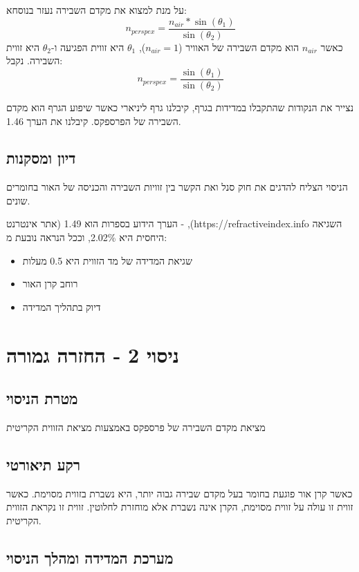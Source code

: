 \documentclass[14pt]{extarticle}
\begin{document}
על מנת למצוא את מקדם השבירה נעזר בנוסחא:
\begin{equation}
n_{perspex} = \frac{n_{air} * \sin(\theta_1)}{\sin(\theta_2)}
\end{equation}
כאשר $n_{air}$ הוא מקדם השבירה של האוויר ($n_{air}=1$), $\theta_1$ היא זווית הפגיעה ו-$\theta_2$ היא זווית השבירה. נקבל:
\begin{equation}
n_{perspex} = \frac{\sin(\theta_1)}{\sin(\theta_2)}
\end{equation}

נצייר את הנקודות שהתקבלו במדידות בגרף, קיבלנו גרף ליניארי כאשר שיפוע הגרף הוא מקדם השבירה של הפרספקס. קיבלנו את הערך 1.46.

\subsection*{דיון ומסקנות}
הניסוי הצליח להדגים את חוק סנל ואת הקשר בין זוויות השבירה והכניסה של האור בחומרים שונים.

הערך הידוע בספרות הוא  1.49 (אתר אינטרנט - ,(https://refractiveindex.info השגיאה היחסית היא 2.02\%, וככל הנראה נובעת מ:
\begin{itemize}
    \item שגיאת המדידה של מד הזווית היא 0.5 מעלות
    \item רוחב קרן האור
    \item דיוק בתהליך המדידה
\end{itemize}

\section*{ניסוי 2 - החזרה גמורה}
\subsection*{מטרת הניסוי}
מציאת מקדם השבירה של פרספקס באמצעות מציאת הזווית הקריטית

\subsection*{רקע תיאורטי}
כאשר קרן אור פוגעת בחומר בעל מקדם שבירה גבוה יותר, היא נשברת בזווית מסוימת. כאשר זווית זו עולה על זווית מסוימת, הקרן אינה נשברת אלא מוחזרת לחלוטין. זווית זו נקראת הזווית הקריטית.

\subsection*{מערכת המדידה ומהלך הניסוי}
\end{document}
